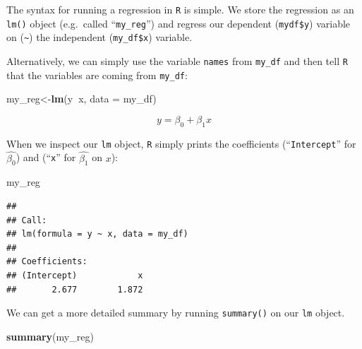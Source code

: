 \documentclass[]{book}
\newenvironment{Shaded}{\begin{snugshade}}{\end{snugshade}}
\newcommand{\KeywordTok}[1]{\textcolor[rgb]{0.13,0.29,0.53}{\textbf{#1}}}
\newcommand{\DataTypeTok}[1]{\textcolor[rgb]{0.13,0.29,0.53}{#1}}
\newcommand{\OperatorTok}[1]{\textcolor[rgb]{0.81,0.36,0.00}{\textbf{#1}}}
\newcommand{\NormalTok}[1]{#1}
\theoremstyle{definition}
\theoremstyle{definition}
\theoremstyle{definition}
\theoremstyle{remark}
\begin{document}
The syntax for running a regression in \texttt{R} is simple. We store
the regression as an \texttt{lm()} object (e.g.~called
``\texttt{my\_reg}'') and regress our dependent (\texttt{mydf\$y})
variable on (\texttt{\textasciitilde{}}) the independent
(\texttt{my\_df\$x}) variable.

\begin{Shaded}
\end{Shaded}

Alternatively, we can simply use the variable \texttt{names} from
\texttt{my\_df} and then tell \texttt{R} that the variables are coming
from \texttt{my\_df}:

\begin{Shaded}
\begin{Highlighting}[]
\NormalTok{my_reg<-}\KeywordTok{lm}\NormalTok{(y}\OperatorTok{~}\NormalTok{x, }\DataTypeTok{data =}\NormalTok{ my_df)}
\end{Highlighting}
\end{Shaded}

\[y=\beta_0+\beta_1 x\]

When we inspect our \texttt{lm} object, \texttt{R} simply prints the
coefficients (``\texttt{Intercept}'' for \(\hat{\beta_0}\)) and
(``\texttt{x}'' for \(\hat{\beta_1}\) on \(x\)):

\begin{Shaded}
\begin{Highlighting}[]
\NormalTok{my_reg}
\end{Highlighting}
\end{Shaded}

\begin{verbatim}
## 
## Call:
## lm(formula = y ~ x, data = my_df)
## 
## Coefficients:
## (Intercept)            x  
##       2.677        1.872
\end{verbatim}

We can get a more detailed summary by running \texttt{summary()} on our
\texttt{lm} object.

\begin{Shaded}
\begin{Highlighting}[]
\KeywordTok{summary}\NormalTok{(my_reg)}
\end{Highlighting}
\end{Shaded}
\end{document}
